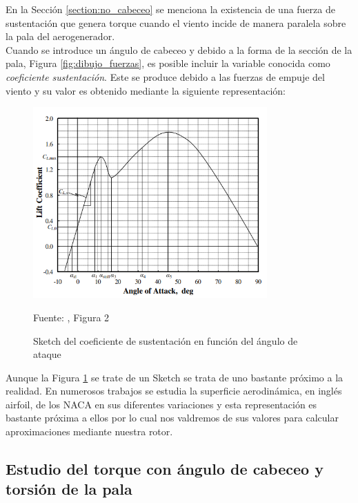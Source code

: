  En la Sección \ref{section:no_cabeceo} se menciona la existencia de una fuerza de sustentación que genera torque cuando el viento incide de manera paralela sobre la pala del aerogenerador.\\
 
 Cuando se introduce un ángulo de cabeceo y debido a la forma de la sección de la pala, Figura \ref{fig:dibujo_fuerzas}, es posible incluir la variable conocida como \textit{coeficiente sustentación}. Este se produce debido a las fuerzas de empuje del viento y su valor es obtenido mediante la siguiente representación:
 
 \begin{figure}[H]
    \centering
    \includegraphics[width=0.8\textwidth]{images/imagen del coeficiente sustentacion.PNG}
    \caption{Sketch del coeficiente de sustentación en función del ángulo de ataque}
    Fuente: \cite{johann2016}, Figura 2
    \label{fig:plot_coef_sustentacion}
\end{figure}

Aunque la Figura \ref{fig:plot_coef_sustentacion} se trate de un Sketch se trata de uno bastante próximo a la realidad. En numerosos trabajos se estudia la superficie aerodinámica, en inglés airfoil, de los NACA en sus diferentes variaciones y esta representación es bastante próxima a ellos por lo cual nos valdremos de sus valores para calcular aproximaciones mediante nuestra rotor.


 
 \subsection{Estudio del torque con ángulo de cabeceo y torsión de la pala}
\label{section:torque_giro_torsion}

